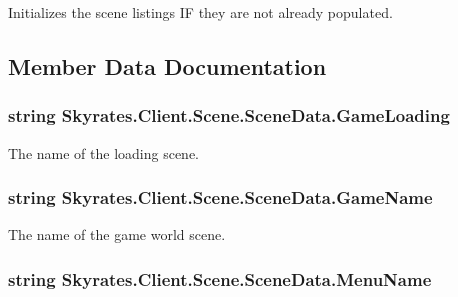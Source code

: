 Initializes the scene listings I\-F they are not already populated. 



\subsection{Member Data Documentation}
\hypertarget{class_skyrates_1_1_client_1_1_scene_1_1_scene_data_a0abaaefcca3b7a51f6ea7c67a9f20b2f}{
\subsubsection[{Game\-Loading}]{\setlength{\rightskip}{0pt plus 5cm}string Skyrates.\-Client.\-Scene.\-Scene\-Data.\-Game\-Loading}}\label{class_skyrates_1_1_client_1_1_scene_1_1_scene_data_a0abaaefcca3b7a51f6ea7c67a9f20b2f}


The name of the loading scene. 

\hypertarget{class_skyrates_1_1_client_1_1_scene_1_1_scene_data_a48d1b49f072d6c1962ef98e479018d4d}{
\subsubsection[{Game\-Name}]{\setlength{\rightskip}{0pt plus 5cm}string Skyrates.\-Client.\-Scene.\-Scene\-Data.\-Game\-Name}}\label{class_skyrates_1_1_client_1_1_scene_1_1_scene_data_a48d1b49f072d6c1962ef98e479018d4d}


The name of the game world scene. 

\hypertarget{class_skyrates_1_1_client_1_1_scene_1_1_scene_data_a4dca2dede679e6f2a2d59f76f2a1f1b6}{
\subsubsection[{Menu\-Name}]{\setlength{\rightskip}{0pt plus 5cm}string Skyrates.\-Client.\-Scene.\-Scene\-Data.\-Menu\-Name}}\label{class_skyrates_1_1_client_1_1_scene_1_1_scene_data_a4dca2dede679e6f2a2d59f76f2a1f1b6}


